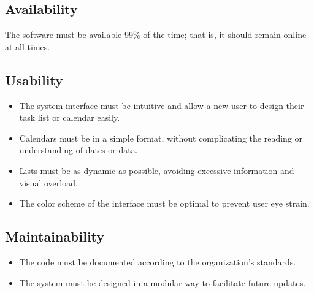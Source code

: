 \documentclass[man]{apa7}
\begin{document}
\subsection{Availability}
The software must be available 99\% of the time; that is, it should remain online at all times.

\subsection{Usability}
\begin{itemize}
    \item The system interface must be intuitive and allow a new user to design their task list or calendar easily.
    \item Calendars must be in a simple format, without complicating the reading or understanding of dates or data.
    \item Lists must be as dynamic as possible, avoiding excessive information and visual overload.
    \item The color scheme of the interface must be optimal to prevent user eye strain.
\end{itemize}

\subsection{Maintainability}
\begin{itemize}
    \item The code must be documented according to the organization’s standards.
    \item The system must be designed in a modular way to facilitate future updates.
\end{itemize}
\end{document}
